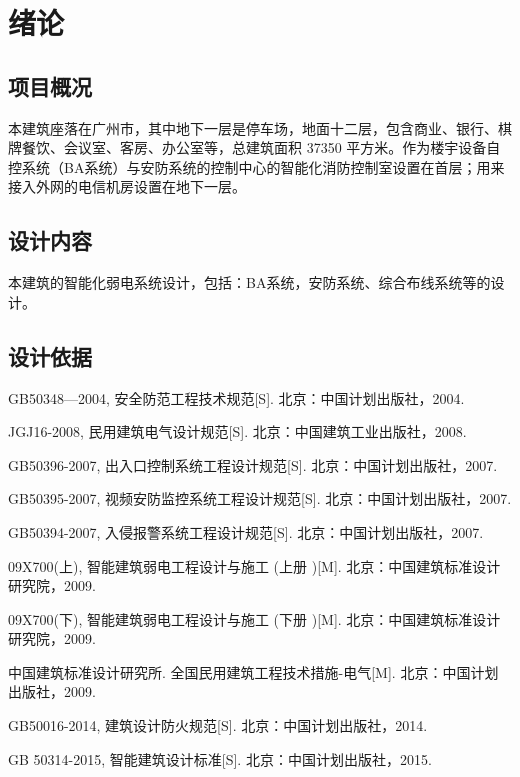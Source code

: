 \documentclass{gdutart}
\begin{document}
  \clearpage

  \tableofcontents\clearpage
  \pagestyle{fancy}\setcounter{page}{1}

  \section{绪论}
    \subsection{项目概况} 本建筑座落在广州市，其中地下一层是停车场，地面十二层，包含商业、银行、棋牌餐饮、会议室、客房、办公室等，总建筑面积 37350 平方米。作为楼宇设备自控系统（BA系统）与安防系统的控制中心的智能化消防控制室设置在首层；用来接入外网的电信机房设置在地下一层。

    \subsection{设计内容} 本建筑的智能化弱电系统设计，包括：BA系统，安防系统、综合布线系统等的设计。

    \subsection{设计依据}
      \begin{enumerate}[label={[\arabic*]}]
        \item GB50348—2004, 安全防范工程技术规范[S]. 北京：中国计划出版社，2004.
        \item JGJ16-2008, 民用建筑电气设计规范[S]. 北京：中国建筑工业出版社，2008.
        \item GB50396-2007, 出入口控制系统工程设计规范[S]. 北京：中国计划出版社，2007.
        \item GB50395-2007, 视频安防监控系统工程设计规范[S]. 北京：中国计划出版社，2007.
        \item GB50394-2007, 入侵报警系统工程设计规范[S]. 北京：中国计划出版社，2007.
        \item 09X700(上), 智能建筑弱电工程设计与施工 (上册 )[M]. 北京：中国建筑标准设计研究院，2009.
        \item 09X700(下), 智能建筑弱电工程设计与施工 (下册 )[M]. 北京：中国建筑标准设计研究院，2009.
        \item 中国建筑标准设计研究所. 全国民用建筑工程技术措施-电气[M]. 北京：中国计划出版社，2009.
        \item GB50016-2014, 建筑设计防火规范[S]. 北京：中国计划出版社，2014.
        \item GB 50314-2015, 智能建筑设计标准[S]. 北京：中国计划出版社，2015.
      \end{enumerate}\clearpage
\end{document}
